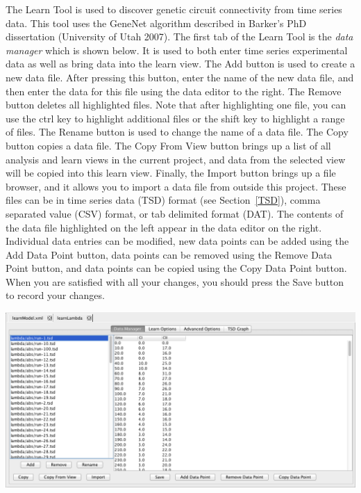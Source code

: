 \documentclass[titlepage,11pt]{article}
\begin{document}
\noindent
The Learn Tool is used to discover genetic circuit connectivity from time series data.  This tool uses the GeneNet algorithm described in
Barker's PhD dissertation (University of Utah 2007).
  The first tab of the Learn Tool is the \emph{data manager} which is shown below.  It is used to both enter time series experimental data as well as bring data into the learn view.  The Add button is used to create a new data file. After pressing this button, enter the name of the new data file, and then enter the data for this file using the data editor to the right.  The Remove button deletes all highlighted files.  Note that after highlighting one file, you can use the ctrl key to highlight additional files or the shift key to highlight a range of files.  The Rename button is used to change the name of a data file. The Copy button copies a data file. The Copy From View button brings up a list of all analysis and learn views in the current project, and data from the selected view will be copied into this learn view.  Finally, the Import button brings up a file browser, and it allows you to import a data file from outside
this project.  These files can be in time series data (TSD) format (see Section~\ref{TSD}), comma separated value (CSV) format, or tab delimited format (DAT).  
The contents of the data file highlighted on the left appear in the data editor on the right.  Individual data entries can be modified, new data points can be added using the Add Data Point button, data points can be removed using the Remove Data Point button, and data points can be copied using the Copy Data Point button.  When you are
satisfied with all your changes, you should press the Save button to record your changes.

\begin{center}
\includegraphics[width=160mm]{screenshots/dataManager}
\end{center}
\end{document}
